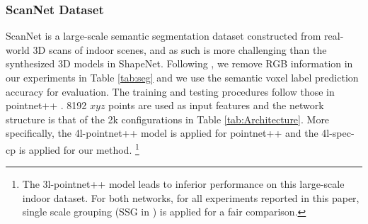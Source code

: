 \documentclass[runningheads]{llncs}
\begin{document}
\subsubsection{ScanNet Dataset}
ScanNet is a large-scale semantic segmentation dataset constructed from real-world 3D scans of indoor scenes, and as such is more challenging than the synthesized 3D models in ShapeNet. Following \cite{qi2017pointnet}\cite{dai2017scannet}, we remove RGB information in our experiments in Table \ref{tab:seg} and we use the semantic voxel label prediction accuracy for evaluation. The training and testing procedures follow those in pointnet++ \cite{qi2017pointnet}. 8192 $xyz$ points are used as input features and the network structure is that of the 2k configurations in Table \ref{tab:Architecture}. More specifically, the 4l-pointnet++ model is applied for pointnet++ and the 4l-spec-cp is applied for our method. \footnote{The 3l-pointnet++ model leads to inferior performance on this large-scale indoor dataset. For both networks, for all experiments reported in this paper, single scale grouping (SSG in \cite{qi2017pointnet}) is applied for a fair comparison.
}
\end{document}
